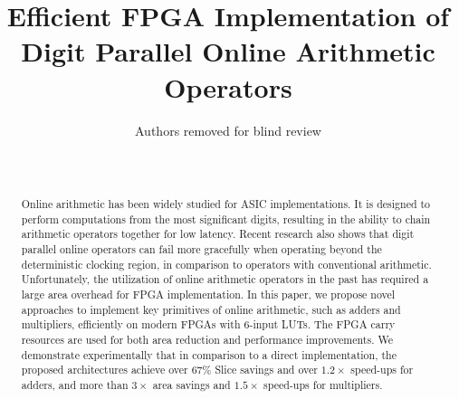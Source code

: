 \documentclass[conference]{IEEEtran}
\begin{document}
\title{Efficient FPGA Implementation of\\ Digit Parallel Online Arithmetic Operators}


\author{Authors removed for blind review\\ \\ \\}

\maketitle


\begin{abstract}
Online arithmetic has been widely studied for ASIC implementations. It is designed to perform computations from the most significant digits, resulting in the ability to chain arithmetic operators together for low latency. Recent research also shows that digit parallel online operators can fail more gracefully when operating beyond the deterministic clocking region, in comparison to operators with conventional arithmetic. Unfortunately, the utilization of online arithmetic operators in the past has required a large area overhead for FPGA implementation. In this paper, we propose novel approaches to implement key primitives of online arithmetic, such as adders and multipliers, efficiently on modern FPGAs with 6-input LUTs. The FPGA carry resources are used for both area reduction and performance improvements. We demonstrate experimentally that in comparison to a direct implementation, the proposed architectures achieve over $67\%$ Slice savings and over $1.2\times$ speed-ups for adders, and more than $3\times$ area savings and $1.5\times$ speed-ups for multipliers.






\end{abstract}
\end{document}
